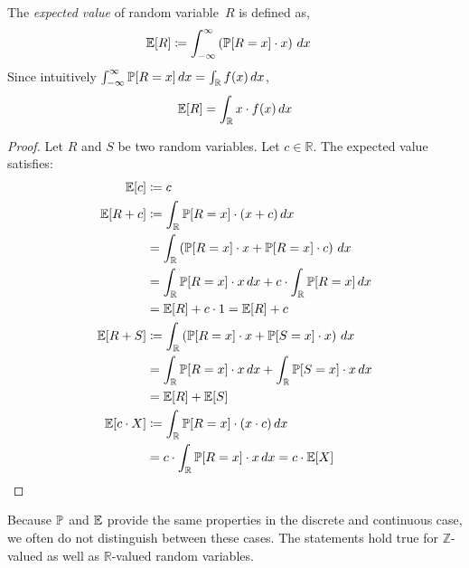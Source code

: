 \begin{definition}
  The \emph{expected value} of random variable~$R$ %
  is defined as,
  \begin{align}
    \mathbb E[R] &\coloneqq \int_{-\infty}^\infty \left(\mathbb P[R=x] \cdot x\right) \, dx
  \end{align}
  Since intuitively $\int_{-\infty}^\infty \mathbb P[R=x] \, dx = \int_{\mathbb R} f(x) \, dx$,
  \[ \mathbb E[R] = \int_{\mathbb R} x \cdot f(x) \, dx \]
\end{definition}
%
\begin{proof}
  Let $R$ and $S$ be two random variables. Let $c \in \mathbb R$.
  The expected value satisfies:
  \begin{align}
    \mathbb E[c]     &\coloneqq c \label{eq:Ec} \\
    \mathbb E[R + c] &\coloneqq \int_{\mathbb R} \mathbb P[R=x] \cdot (x + c) \, dx \notag\\
              &= \int_{\mathbb R} \left(\mathbb P[R=x] \cdot x + \mathbb P[R=x] \cdot c\right) \, dx \notag\\
              &= \int_{\mathbb R} \mathbb P[R=x] \cdot x \, dx + c \cdot \int_{\mathbb R} \mathbb P[R=x] \, dx \notag\\
              &= \mathbb E[R] + c \cdot 1 = \mathbb E[R] + c \\
    \mathbb E[R + S] &\coloneqq \int_{\mathbb R} \left(\mathbb P[R=x] \cdot x + \mathbb P[S=x] \cdot x\right) \, dx \notag\\
              &= \int_{\mathbb R} \mathbb P[R=x] \cdot x \, dx + \int_{\mathbb R} \mathbb P[S=x] \cdot x \, dx \notag\\
              &= \mathbb E[R] + \mathbb E[S] \label{eq:Evv} \\
    \mathbb E[c \cdot X] &\coloneqq \int_{\mathbb R} \mathbb P[R=x] \cdot (x \cdot c) \, dx \notag\\
              &= c \cdot \int_{\mathbb R} \mathbb P[R=x] \cdot x \, dx
              = c \cdot \mathbb E[X] \label{eq:Ecv}
  \end{align}
\end{proof}
Because $\mathbb P$ and $\mathbb E$ provide the same properties in the discrete and continuous case,
we often do not distinguish between these cases. The statements hold true for $\mathbb Z$-valued
as well as $\mathbb R$-valued random variables.


